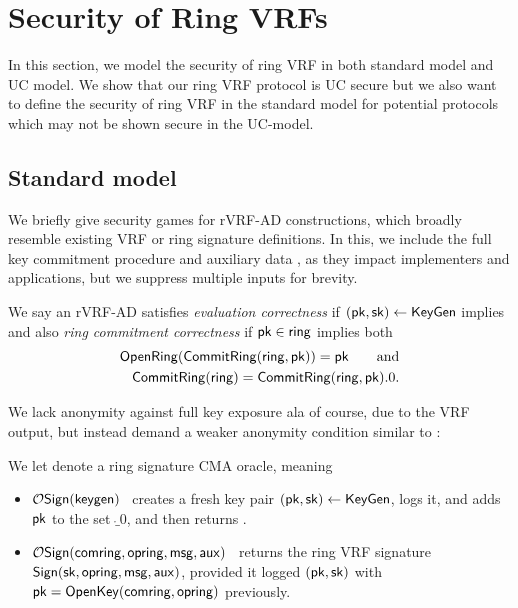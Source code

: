 
\section{Security of Ring VRFs}

In this section, we model the security of ring VRF in both standard model and UC model. We show that our ring VRF protocol is UC secure but we also want to define the security of ring VRF in the standard model for potential protocols which may not be shown secure in the UC-model. 

\subsection{Standard model}
\label{subsec:rvrf_games}

We briefly give security games for rVRF-AD constructions, which broadly
resemble existing VRF or ring signature definitions.  In this, we include
the full key commitment procedure and auxiliary data \aux, as they impact
implementers and applications, but we suppress multiple inputs for brevity.


\begin{definition}
We say an rVRF-AD satisfies {\em evaluation correctness} if
$(\mathsf{pk},\mathsf{sk}) \leftarrow {\ensuremath{\mathsf{KeyGen}}}$ implies
\def\tmpC{\Eval(\sk,\msg) = \Verify(\pk,\msg,\aux,\Sign(\sk,\msg,\aux))}
\eprint{$\tmpC$, succeeds}{$$ \tmpC, $$}
and also {\em ring commitment correctness} if
$\mathsf{pk} \in \mathsf{ring}$ implies both
\def\tmpA{\OpenRing(\CommitRing(\ring,\pk)) = \pk}
\def\tmpB{\CommitRing(\ring) = \CommitRing(\ring,\pk).0} 
\eprint{$$ \tmpA \quad\textrm{and}\quad \tmpB \mathperiod $$}%
{$$ \begin{aligned}
   \tmpA \qquad\textrm{and} \\
   \tmpB \mathperiod
\end{aligned} $$}
\end{definition}

We lack anonymity against full key exposure ala
 \cite[pp. 6 Def. 4]{cryptoeprint:2005:304} of course, due to the VRF output,
but instead demand a weaker anonymity condition similar to
 \cite[pp. 5 Def. 3]{cryptoeprint:2005:304}:

\begin{definition}\label{def:rvrf_sign_oracle}
We let  denote a ring signature CMA oracle, meaning
\begin{itemize}
\item $\mathcal{O}\mathsf{Sign}(\mathsf{keygen})$ \, 
 creates a fresh key pair $(\mathsf{pk},\mathsf{sk}) \leftarrow {\ensuremath{\mathsf{KeyGen}}}$, logs it, and
 adds $\mathsf{pk}$ to the set $\ring_0$, and then returns \pk.
\item $\mathcal{O}\mathsf{Sign}(\mathsf{comring},\mathsf{opring},\mathsf{msg},\mathsf{aux})$ \,
 returns the ring VRF signature ${\mathsf{Sign}}(\mathsf{sk},\mathsf{opring},\mathsf{msg},\mathsf{aux})$,
 provided it logged $(\mathsf{pk},\mathsf{sk})$ with $\mathsf{pk} = {\mathsf{OpenKey}}(\mathsf{comring},\mathsf{opring})$ previously.
\end{itemize}
\end{definition}

